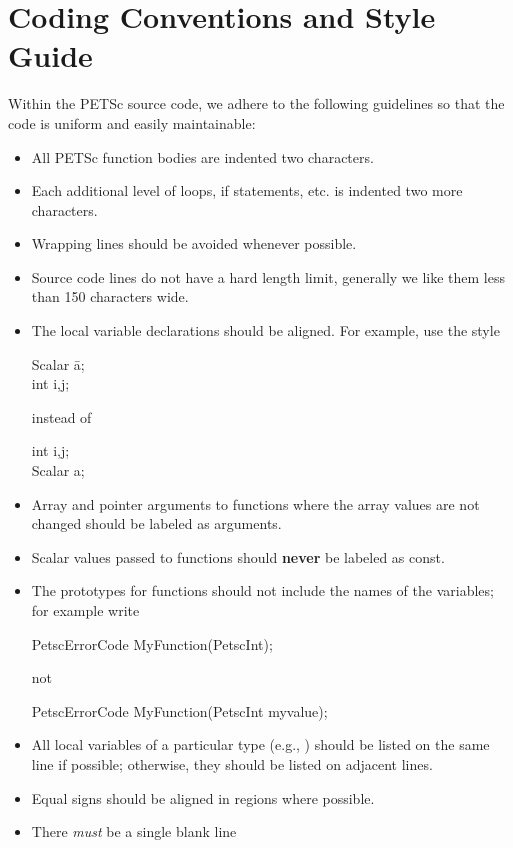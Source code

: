 \documentclass[twoside,12pt]{../sty/report_petsc}
\begin{document}
\section{Coding Conventions and Style Guide}

Within the PETSc source code, we adhere to the following guidelines
so that the code is uniform and easily maintainable:

\begin{itemize}
\item All PETSc function bodies are indented two characters.
\item Each additional level of loops, if statements, etc. is indented
      two more characters.
\item Wrapping lines should be avoided whenever possible.
\item Source code lines do not have a hard length limit, generally we like them less than 150 characters wide.
\item The local variable declarations should be aligned. For example,
      use the style
\begin{tabbing}
   Scalar \=a;\\
   int \>i,j;\\
\end{tabbing}
instead of
\begin{tabbing}
   int    i,j;\\
   Scalar a;
\end{tabbing}
\item Array and pointer arguments to functions where the array values are not changed should be labeled as  arguments.
\item Scalar values passed to functions should {\bf never} be labeled as const.
\item The prototypes for functions should not include the names of the variables; for example write
\begin{tabbing}
PetscErrorCode MyFunction(PetscInt);
\end{tabbing}
not
\begin{tabbing}
PetscErrorCode MyFunction(PetscInt myvalue);
\end{tabbing}
\item All local variables of a particular type (e.g., ) should be
      listed on the same line if possible; otherwise, they should be listed
      on adjacent lines.
\item Equal signs should be aligned in regions where possible.
\item There {\em must} be a single blank line

\end{itemize}
\end{document}
